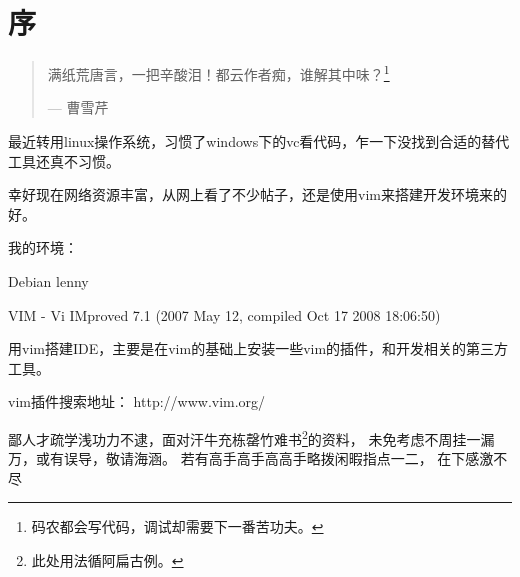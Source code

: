 \chapter{序}

\begin{quotation}
满纸荒唐言，一把辛酸泪！都云作者痴，谁解其中味？\footnote{码农都会写代码，调试却需要下一番苦功夫。}
\begin{flushright}
--- 曹雪芹
\end{flushright}
\end{quotation}

最近转用linux操作系统，习惯了windows下的vc看代码，乍一下没找到合适的替代工具还真不习惯。

幸好现在网络资源丰富，从网上看了不少帖子，还是使用vim来搭建开发环境来的好。

我的环境：

        Debian lenny 

        VIM - Vi IMproved 7.1 (2007 May 12, compiled Oct 17 2008 18:06:50)

用vim搭建IDE，主要是在vim的基础上安装一些vim的插件，和开发相关的第三方工具。

         vim插件搜索地址： http://www.vim.org/

鄙人才疏学浅功力不逮，面对汗牛充栋罄竹难书\footnote{此处用法循阿扁古例。}的资料，
未免考虑不周挂一漏万，或有误导，敬请海涵。
若有高手高手高高手略拨闲暇指点一二，
在下感激不尽

